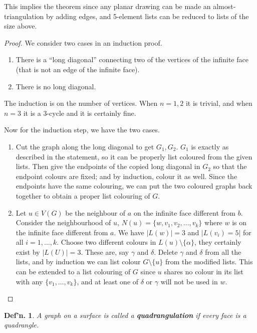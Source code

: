 \documentclass[12pt, a4paper]{book}
\newtheorem{definition}[theorem]{Def'n.}
\theoremstyle{nonumberplain}
\newtheorem{proof}{Proof}
\begin{document}
This implies the theorem since any planar drawing can be made an almost-triangulation by adding edges, and 5-element lists can be reduced to lists of the size above.
\begin{proof}
    We consider two cases in an induction proof.
    \begin{enumerate}[nolistsep]
        \item There is a ``long diagonal'' connecting two of the vertices of the infinite face (that is not an edge of the infinite face).
        \item There is no long diagonal.
    \end{enumerate}
    The induction is on the number of vertices.
    When $n=1,2$ it is trivial, and when $n=3$ it is a 3-cycle and it is certainly fine.

    Now for the induction step, we have the two cases.
    \begin{enumerate}
        \item Cut the graph along the long diagonal to get $G_1,G_2$.
            $G_1$ is exactly as described in the statement, so it can be properly list coloured from the given lists.
            Then give the endpoints of the copied long diagonal in $G_2$ so that the endpoint colours are fixed; and by induction, colour it as well.
            Since the endpoints have the same colouring, we can put the two coloured graphs back together to obtain a proper list colouring of $G$.
        \item Let $u\in V(G)$ be the neighbour of $a$ on the infinite face different from $b$.
            Consider the neighbourhood of $u$, $N(u)=\{w,v_1,v_2,\ldots,v_k\}$ where $w$ is on the infinite face different from $a$.
            We have $|L(w)|=3$ and $|L(v_i)=5|$ for all $i=1,\ldots,k$.
            Choose two different colours in $L(u)\setminus\{\alpha\}$, they certainly exist by $|L(U)|=3$.
            These are, say $\gamma$ and $\delta$.
            Delete $\gamma$ and $\delta$ from all the lists, and by induction we can list colour $G\setminus\{u\}$ from the modified lists.
            This can be extended to a list colouring of $G$ since $u$ shares no colour in its list with any $\{v_1,\ldots,v_k\}$, and at least one of $\delta$ or $\gamma$ will not be used in $w$.
    \end{enumerate}
\end{proof}
\begin{definition}
    A graph on a surface is called a \textbf{quadrangulation} if every face is a quadrangle.
\end{definition}
\end{document}
